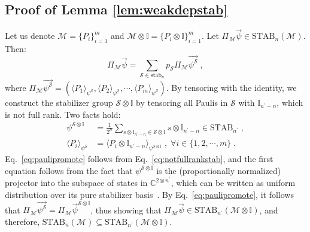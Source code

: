 \documentclass[10pt,aps,pra,twocolumn,floatfix,nofootinbib,superscriptaddress,longbibliography]{revtex4-2}
\newcommand{\1}{\mathbbm{1}}
\begin{document}
\subsection{Proof of Lemma \ref{lem:weakdepstab}\label{proof:weakdepstab}}
\noindent
Let us denote $\mathcal M =\{P_i\}_{i=1}^m$ and $\mathcal M \otimes \mathbb I =\{P_i \otimes \mathbb I\}_{i=1}^m$. Let $\Pi_\mathcal M\vec{\psi}\in \mathrm{STAB}_n(\mathcal M)$. Then:
\begin{equation}
    \Pi_\mathcal M\vec{\psi}= \sum_{\mathcal S \in \mathrm{stab}_n} p_\mathcal S \Pi_\mathcal M\vec{\psi^\mathcal S}\;,
\end{equation}
where $\Pi_\mathcal M\vec{\psi^\mathcal S} = (\langle P_1 \rangle_{\psi^\mathcal S}, \langle P_2 \rangle_{\psi^\mathcal S}, \cdots, \langle P_m \rangle_{\psi^\mathcal S} )$. By tensoring with the identity, we construct the stabilizer group $\mathcal S \otimes \mathbb I$ by tensoring all Paulis in $\mathcal S$ with $\mathbb I_{n^\prime-n}$, which is not full rank. Two facts hold:
\begin{align}
    \psi^{\mathcal S \otimes \mathbb I} &= \frac{1}{2^n}\sum_{s\otimes \mathbb I_{n^\prime-n} \in \mathcal S\otimes \mathbb I}s\otimes \mathbb I_{n^\prime-n} \in \mathrm{STAB}_{n^\prime}\;, \label{eq:notfullrankstab}\\
    \langle P_i\rangle_{\psi^\mathcal S} &= \langle P_i\otimes \mathbb I_{n^\prime-n}\rangle_{\psi^{\mathcal S \otimes \mathbb I}} \;,\; \forall i \in \{1,2,\cdots, m\}\;. \label{eq:paulipromote}
\end{align}
Eq.~\eqref{eq:paulipromote} follows from Eq.~\eqref{eq:notfullrankstab}, and the first equation follows from the fact that $\psi^{\mathcal S \otimes \mathbb I}$ is the (proportionally normalized) projector into the subspace of states in $\mathbb C^{2\otimes n^\prime}$, which can be written as uniform distribution over its pure stabilizer basis~\cite{gottesman2024surviving}. By Eq.~\eqref{eq:paulipromote}, it follows that $\Pi_\mathcal M \vec{\psi^\mathcal S} =  \Pi_\mathcal M \vec{\psi}^{\mathcal S\otimes \mathbb I}$, thus showing that $\Pi_\mathcal M \vec{\psi} \in \mathrm{STAB}_{n^\prime}(\mathcal M\otimes \mathbb I)$, and therefore, $\mathrm{STAB}_n(\mathcal M) \subseteq \mathrm{STAB}_{n^\prime}(\mathcal M \otimes \mathbb I)$.
\end{document}
